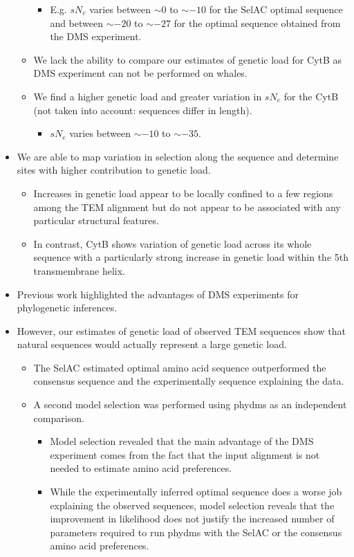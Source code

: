 \documentclass[12pt]{article}
\begin{document}
\begin{itemize}
\begin{itemize}
\begin{itemize}
			\item E.g. $sN_e$ varies between $\sim0$ to $\sim-10$ for the SelAC optimal sequence and between $\sim -20$ to $\sim -27$ for the optimal sequence obtained from the DMS experiment.
		\end{itemize}
		\item We lack the ability to compare our estimates of genetic load for CytB as DMS experiment can not be performed on whales.
		\item We find a higher genetic load and greater variation in $sN_e$ for the CytB (not taken into account: sequences differ in length).
		\begin{itemize}
			\item $sN_e$ varies between $\sim -10$ to $\sim -35$.
		\end{itemize}
	\end{itemize}
	\item We are able to map variation in selection along the sequence and determine sites with higher contribution to genetic load.
	\begin{itemize}
		\item Increases in genetic load appear to be locally confined to a few regions among the TEM alignment but do not appear to be associated with any particular structural features.
		\item In contrast, CytB shows variation of genetic load across its whole sequence with a particularly strong increase in genetic load within the 5th transmembrane helix.
	\end{itemize}
	\item Previous work highlighted the advantages of DMS experiments for phylogenetic inferences.
	\item However, our estimates of genetic load of observed TEM sequences show that natural sequences would actually represent a large genetic load.
	\begin{itemize}
		\item The SelAC estimated optimal amino acid sequence outperformed the consensus sequence and the experimentally sequence explaining the data. 
		\item A second model selection was performed using phydms as an independent comparison.
		\begin{itemize}
			\item Model selection revealed that the main advantage of the DMS experiment comes from the fact that the input alignment is not needed to estimate amino acid preferences.
			\item While the experimentally inferred optimal sequence does a worse job explaining the observed sequences, model selection reveals that the improvement in likelihood does not justify the increased number of parameters required to run phydms with the SelAC or the consensus amino acid preferences.
		\end{itemize}
	\end{itemize}
\end{itemize}
\end{document}

